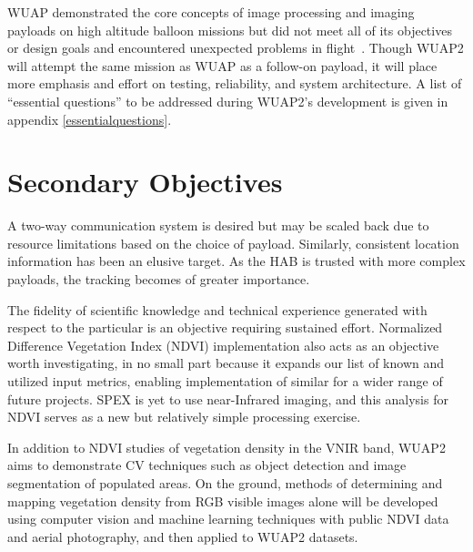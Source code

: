 \documentclass[conference]{IEEEtran} %
\begin{document}
WUAP demonstrated the core concepts of image processing and imaging payloads on high altitude balloon missions but did not meet all of its objectives or design goals and encountered unexpected problems in flight~\cite[Post-Flight Analysis]{wuaphab4}. 
Though WUAP2 will attempt the same mission as WUAP as a follow-on payload, it will place more emphasis and effort on testing, reliability, and system architecture. A list of ``essential questions'' to be addressed during WUAP2's development is given in appendix \ref{essentialquestions}.


\section{Secondary Objectives}
\label{secondaryobjectives}
A two-way communication system is desired but may be scaled back due to resource limitations based on the choice of payload. 
Similarly, consistent location information has been an elusive target. 
As the HAB is trusted with more complex payloads, the tracking becomes of greater importance.

The fidelity of scientific knowledge and technical experience generated with respect to the particular is an objective requiring sustained effort.
Normalized Difference Vegetation Index (NDVI) implementation also acts as an objective worth investigating, in no small part because it expands our list of known and utilized input metrics, enabling implementation of similar for a wider range of future projects. 
SPEX is yet to use near-Infrared imaging, and this analysis for NDVI serves as a new but relatively simple processing exercise.
 
In addition to NDVI studies of vegetation density in the VNIR band, WUAP2 aims to demonstrate CV techniques such as object detection and image segmentation of populated areas. 
On the ground, methods of determining and mapping vegetation density from RGB visible images alone will be developed using computer vision and machine learning techniques with public NDVI data and aerial photography, and then applied to WUAP2 datasets. 
\end{document}
